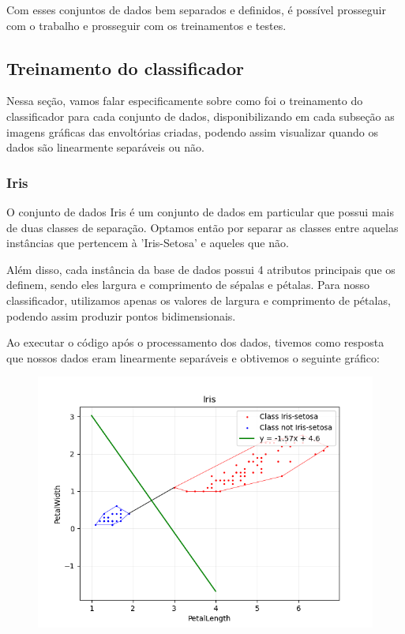 \documentclass{article}
\begin{document}
Com esses conjuntos de dados bem separados e definidos, é possível prosseguir com o trabalho e prosseguir com os treinamentos e testes.

\subsection{Treinamento do classificador}

Nessa seção, vamos falar especificamente sobre como foi o treinamento do classificador para cada conjunto de dados, disponibilizando em cada subseção as imagens gráficas das envoltórias criadas, podendo assim visualizar quando os dados são linearmente separáveis ou não.

\subsubsection{Iris}

O conjunto de dados Iris é um conjunto de dados em particular que possui mais de duas classes de separação. Optamos então por separar as classes entre aquelas instâncias que pertencem à 'Iris-Setosa' e aqueles que não.

Além disso, cada instância da base de dados possui 4 atributos principais que os definem, sendo eles largura e comprimento de sépalas e pétalas. Para nosso classificador, utilizamos apenas os valores de largura e comprimento de pétalas, podendo assim produzir pontos bidimensionais.

Ao executar o código após o processamento dos dados, tivemos como resposta que nossos dados eram linearmente separáveis e obtivemos o seguinte gráfico:

\begin{figure} [H]
	\includegraphics[width=12cm]{iris.png}
	\centering
\end{figure}
\end{document}
